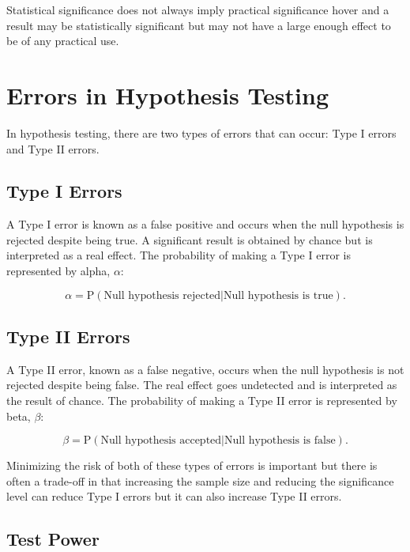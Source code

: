 \documentclass[
]{book}
\begin{document}
Statistical significance does not always imply practical significance hover and a result may be statistically significant but may not have a large enough effect to be of any practical use.

\hypertarget{errors-in-hypothesis-testing}{%
\section{Errors in Hypothesis Testing}\label{errors-in-hypothesis-testing}}

In hypothesis testing, there are two types of errors that can occur: Type I errors and Type II errors.

\hypertarget{type-i-errors}{%
\subsection{Type I Errors}\label{type-i-errors}}

A Type I error is known as a false positive and occurs when the null hypothesis is rejected despite being true. A significant result is obtained by chance but is interpreted as a real effect. The probability of making a Type I error is represented by alpha, \(\alpha\):

\[\alpha= \textrm{P}(\textrm{Null hypothesis rejected} | \textrm{Null hypothesis is true}).\]

\hypertarget{type-ii-errors}{%
\subsection{Type II Errors}\label{type-ii-errors}}

A Type II error, known as a false negative, occurs when the null hypothesis is not rejected despite being false. The real effect goes undetected and is interpreted as the result of chance. The probability of making a Type II error is represented by beta, \(\beta\):

\[\beta= \textrm{P} (\textrm{Null hypothesis accepted} | \textrm{Null hypothesis is false}).\]

Minimizing the risk of both of these types of errors is important but there is often a trade-off in that increasing the sample size and reducing the significance level can reduce Type I errors but it can also increase Type II errors.

\hypertarget{test-power}{%
\subsection{Test Power}\label{test-power}}
\end{document}
